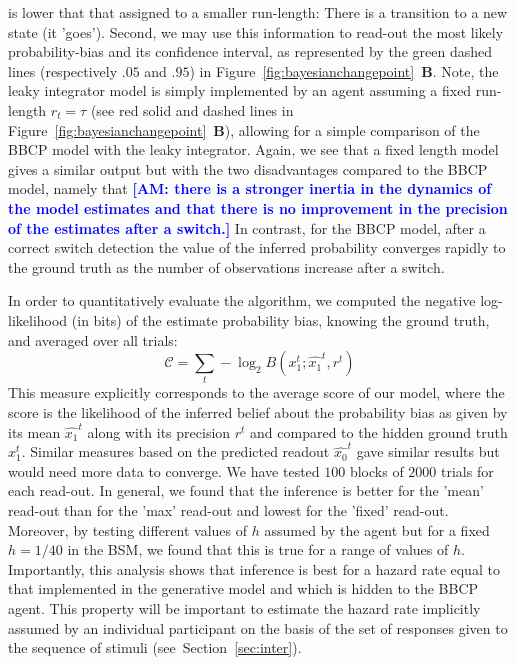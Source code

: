 \documentclass[12pt,english]{article}%
\newcommand{\eql}[1]{\begin{equation}#1\end{equation}}
\newcommand{\Cc}{\mathcal{C}}
\newcommand{\seeFig}[1]{Figure~\ref{fig:#1}}
\newcommand{\seeSec}[1]{Section~\ref{sec:#1}}
\newcommand{\AM}[1]{\textbf{\textcolor{blue}{[AM: #1]}}}
\begin{document}
is lower that that assigned to a smaller run-length:
There is a transition to a new state (it 'goes').
Second, we may use this information to read-out the most likely probability-bias and its confidence interval,
as represented by the green dashed lines (respectively $.05$ and $.95$) in \seeFig{bayesianchangepoint}~\textbf{B}.
Note, the leaky integrator model is simply implemented
by an agent assuming a fixed run-length $r_t=\tau$ (see red solid and dashed lines in \seeFig{bayesianchangepoint}~\textbf{B}),
allowing for a simple comparison of the BBCP model with the leaky integrator.
Again, we see that a fixed length model gives a similar output
but with the two disadvantages compared to the BBCP model, namely that \AM{there is a stronger inertia in the dynamics of the model estimates and that there is no improvement in the precision of the estimates after a switch.}
In contrast, for the BBCP model, after a correct switch detection
the value of the inferred probability converges rapidly to the ground truth
as the number of observations increase after a switch.


In order to quantitatively evaluate the algorithm,
we computed the  negative log-likelihood (in bits) of the estimate probability bias,
knowing the ground truth, 
and averaged over all trials:
\eql{
\Cc =  \sum_{t} -\log_2 B(x_1^t ; \hat{x_1}^t, r^t )
\label{eq:MI}
}
This measure explicitly corresponds to the average score of our model,
where the score is the likelihood of the inferred belief about the probability bias
as given by its mean $\hat{x_1}^t$ along with its precision $r^t$ and
compared to the hidden ground truth $x_1^t$. 
Similar measures based on the predicted readout $\hat{x_0}^t$
gave similar results but would need more data to converge.
We have tested $100$ blocks of $2000$ trials for each read-out.
In general, we found that the inference is better for the 'mean' read-out
than for the 'max' read-out and lowest for the 'fixed' read-out.
Moreover, by testing different values of $h$ assumed by the agent
but for a fixed $h=1/40$ in the BSM,
we found that this is true for a range of values of $h$.
Importantly, this analysis shows that inference is best for a hazard rate
equal to that implemented in the generative model and which is hidden to the BBCP agent.
This property will be important to estimate the hazard rate implicitly assumed by an individual participant
on the basis of the set of responses given to the  sequence of stimuli
(see~\seeSec{inter}).
\end{document}
